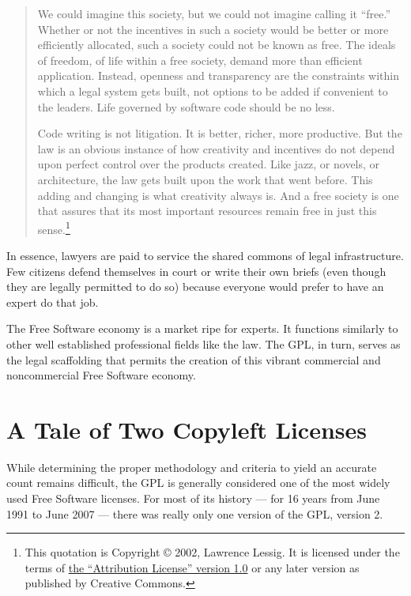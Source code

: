 \begin{quotation}
We could imagine this society, but we could not imagine calling it
``free.''  Whether or not the incentives in such a society would be better
or more efficiently allocated, such a society could not be known as free.
The ideals of freedom, of life within a free society, demand more than
efficient application.  Instead, openness and transparency are the
constraints within which a legal system gets built, not options to be
added if convenient to the leaders.  Life governed by software code should
be no less.

Code writing is not litigation.  It is better, richer, more
productive.  But the law is an obvious instance of how creativity and
incentives do not depend upon perfect control over the products
created.  Like jazz, or novels, or architecture, the law gets built
upon the work that went before. This adding and changing is what
creativity always is.  And a free society is one that assures that its
most important resources remain free in just this sense.\footnote{This
quotation is Copyright \copyright{} 2002, Lawrence Lessig. It is
licensed under the terms of
\href{http://creativecommons.org/licenses/by/1.0/}{the ``Attribution
License'' version 1.0} or any later version as published by Creative
Commons.}
\end{quotation}

In essence, lawyers are paid to service the shared commons of legal
infrastructure.  Few citizens defend themselves in court or write their
own briefs (even though they are legally permitted to do so) because
everyone would prefer to have an expert do that job.

The Free Software economy is a market ripe for experts.  It
functions similarly to other well established professional fields like the
law. The GPL, in turn, serves as the legal scaffolding that permits the
creation of this vibrant commercial and noncommercial Free Software
economy.

\chapter{A Tale of Two Copyleft Licenses}

While determining the proper methodology and criteria to yield an accurate
count remains difficult, the GPL is generally considered one of the most
widely used Free Software licenses.  For most of its history --- for 16 years
from June 1991 to June 2007 --- there was really only one version of the GPL,
version 2.

